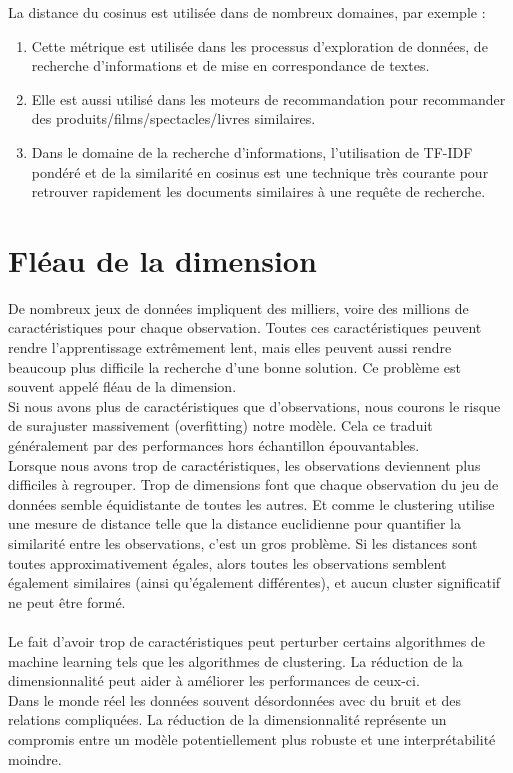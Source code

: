 La distance du cosinus est utilisée dans de nombreux domaines, par exemple :
\begin{enumerate}
    \item Cette métrique est utilisée dans les processus d'exploration de données, de recherche d'informations et de mise en correspondance de textes.
    \item Elle est aussi utilisé dans les moteurs de recommandation pour recommander des produits/films/spectacles/livres similaires.
    \item Dans le domaine de la recherche d'informations, l'utilisation de TF-IDF pondéré et de la similarité en cosinus est une technique très courante pour retrouver rapidement les documents similaires à une requête de recherche.
\end{enumerate}


\newpage


\section{Fléau de la dimension}
De nombreux jeux de données impliquent des milliers, voire des millions de caractéristiques pour chaque observation. Toutes ces caractéristiques peuvent rendre l'apprentissage extrêmement lent, mais elles peuvent aussi rendre beaucoup plus difficile la recherche d'une bonne solution. Ce problème est souvent appelé fléau de la dimension.
\\
Si nous avons plus de caractéristiques que d'observations, nous courons le risque de surajuster massivement (overfitting) notre modèle. Cela ce traduit généralement par des performances hors échantillon épouvantables.
\\
Lorsque nous avons trop de caractéristiques, les observations deviennent plus difficiles à regrouper. Trop de dimensions font que chaque observation du jeu de données semble équidistante de toutes les autres. Et comme le clustering utilise une mesure de distance telle que la distance euclidienne pour quantifier la similarité entre les observations, c'est un gros problème. Si les distances sont toutes approximativement égales, alors toutes les observations semblent également similaires (ainsi qu'également différentes), et aucun cluster significatif ne peut être formé.
\\
\\
Le fait d'avoir trop de caractéristiques peut perturber certains algorithmes de machine learning tels que les algorithmes de clustering. La réduction de la dimensionnalité peut aider à améliorer les performances de ceux-ci.
\\
Dans le monde réel les données souvent désordonnées avec du bruit et des relations compliquées. La réduction de la dimensionnalité représente un compromis entre un modèle potentiellement plus robuste et une interprétabilité moindre.


